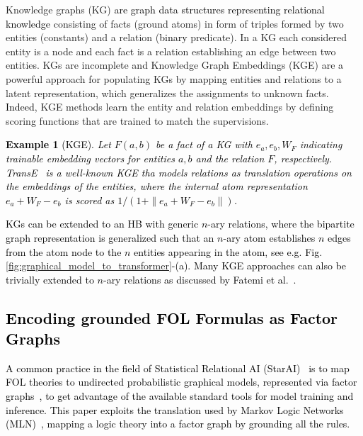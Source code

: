 \documentclass[journal]{IEEEtran}
\newtheorem{example}{Example}
\newcommand{\ar}[1]{\textcolor{black}{#1}}
\begin{document}
Knowledge graphs (KG) \ar{are graph data structures representing relational knowledge} consisting of facts (ground atoms) in form of triples formed by two entities (constants) and a relation (\ar{binary} predicate). In a KG each considered entity is a node and each fact is a relation establishing an edge between two entities. KGs are
incomplete and Knowledge Graph Embeddings (KGE) are a powerful approach for populating KGs by mapping entities and relations to a latent representation, which generalizes the assignments to unknown facts. \ar{Indeed}, KGE methods learn the entity and relation embeddings by defining scoring functions that are trained to match the supervisions.
\ar{\begin{example}[KGE]
\label{ex:kge}
Let $F(a,b)$ be a fact of a KG with $e_a,e_b,W_F$ indicating trainable embedding vectors for entities $a,b$ and the relation $F$, respectively. \emph{TransE}~\cite{bordes2013translating} is a well-known KGE tha models relations as translation operations on the embeddings of the entities, where the internal atom representation $e_a + W_F - e_b$ is scored as $1 / (1 + \|e_a + W_F - e_b\|)$.
\end{example}}
\ar{%
KGs can be extended to an HB with generic $n$-ary relations, where the bipartite graph representation is generalized such that an $n$-ary atom establishes $n$ edges from the atom node to the $n$ entities appearing in the atom, see e.g. Fig. \ref{fig:graphical_model_to_transformer}-(a).
Many KGE approaches can also be trivially extended to $n$-ary relations as discussed by Fatemi et al.~\cite{fatemi2021knowledge}.
}
\ar{\subsection{Encoding grounded FOL Formulas as Factor Graphs}
\label{sec:fg}}
\ar{A common practice in the field of Statistical Relational AI (StarAI)~\cite{de2008survey} is to map FOL theories to undirected probabilistic graphical models, represented via factor graphs~\cite{haykin1994}, to get advantage of the available standard tools for model training and inference. This paper exploits the translation used by Markov Logic Networks (MLN)~\cite{richardson2006markov}, mapping a logic theory into a factor graph by grounding all the rules.}
\end{document}
